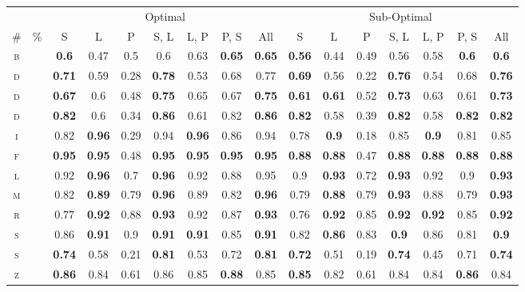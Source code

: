 \documentclass[letterpaper]{article}
\begin{document}
\begin{table*}[]
\centering
\fontsize{5}{6}\selectfont
\setlength\tabcolsep{1.5pt}
\begin{tabular}{cc|ccc|ccc|c||ccc|ccc|c}
\toprule
\multicolumn{2}{c}{} & \multicolumn{7}{c}{Optimal} & \multicolumn{7}{c}{Sub-Optimal}\\
\cmidrule(lr){3-9}\cmidrule(lr){10-16}
\# & \% & S & L & P & S, L & L, P & P, S & All%
& S & L & P & S, L & L, P & P, S & All\\
\midrule
\textsc{b}%
 &  & \textbf{0.6} & 0.47 & 0.5 & 0.6 & 0.63 & \textbf{0.65} & \textbf{0.65} & \textbf{0.56} & 0.44 & 0.49 & 0.56 & 0.58 & \textbf{0.6} & \textbf{0.6}\\\hline%
 \textsc{d}%
 &  & \textbf{0.71} & 0.59 & 0.28 & \textbf{0.78} & 0.53 & 0.68 & 0.77 & \textbf{0.69} & 0.56 & 0.22 & \textbf{0.76} & 0.54 & 0.68 & \textbf{0.76}\\\hline%
 \textsc{d}%
 &  & \textbf{0.67} & 0.6 & 0.48 & \textbf{0.75} & 0.65 & 0.67 & \textbf{0.75} & \textbf{0.61} & \textbf{0.61} & 0.52 & \textbf{0.73} & 0.63 & 0.61 & \textbf{0.73}\\\hline%
 \textsc{d}%
 &  & \textbf{0.82} & 0.6 & 0.34 & \textbf{0.86} & 0.61 & 0.82 & \textbf{0.86} & \textbf{0.82} & 0.58 & 0.39 & \textbf{0.82} & 0.58 & \textbf{0.82} & \textbf{0.82}\\\hline%
 \textsc{i}%
 &  & 0.82 & \textbf{0.96} & 0.29 & 0.94 & \textbf{0.96} & 0.86 & 0.94 & 0.78 & \textbf{0.9} & 0.18 & 0.85 & \textbf{0.9} & 0.81 & 0.85\\\hline%
 \textsc{f}%
 &  & \textbf{0.95} & \textbf{0.95} & 0.48 & \textbf{0.95} & \textbf{0.95} & \textbf{0.95} & \textbf{0.95} & \textbf{0.88} & \textbf{0.88} & 0.47 & \textbf{0.88} & \textbf{0.88} & \textbf{0.88} & \textbf{0.88}\\\hline%
 \textsc{l}%
 &  & 0.92 & \textbf{0.96} & 0.7 & \textbf{0.96} & 0.92 & 0.88 & 0.95 & 0.9 & \textbf{0.93} & 0.72 & \textbf{0.93} & 0.92 & 0.9 & \textbf{0.93}\\\hline%
 \textsc{m}%
 &  & 0.82 & \textbf{0.89} & 0.79 & \textbf{0.96} & 0.89 & 0.82 & \textbf{0.96} & 0.79 & \textbf{0.88} & 0.79 & \textbf{0.93} & 0.88 & 0.79 & \textbf{0.93}\\\hline%
 \textsc{r}%
 &  & 0.77 & \textbf{0.92} & 0.88 & \textbf{0.93} & 0.92 & 0.87 & \textbf{0.93} & 0.76 & \textbf{0.92} & 0.85 & \textbf{0.92} & \textbf{0.92} & 0.85 & \textbf{0.92}\\\hline%
 \textsc{s}%
 &  & 0.86 & \textbf{0.91} & 0.9 & \textbf{0.91} & \textbf{0.91} & 0.85 & \textbf{0.91} & 0.82 & \textbf{0.86} & 0.83 & \textbf{0.9} & 0.86 & 0.81 & \textbf{0.9}\\\hline%
 \textsc{s}%
 &  & \textbf{0.74} & 0.58 & 0.21 & \textbf{0.81} & 0.53 & 0.72 & \textbf{0.81} & \textbf{0.72} & 0.51 & 0.19 & \textbf{0.74} & 0.45 & 0.71 & \textbf{0.74}\\\hline%
 \textsc{z}%
 &  & \textbf{0.86} & 0.84 & 0.61 & 0.86 & 0.85 & \textbf{0.88} & 0.85 & \textbf{0.85} & 0.82 & 0.61 & 0.84 & 0.84 & \textbf{0.86} & 0.84\\\hline%


\end{tabular}
\end{table*}
\end{document}
